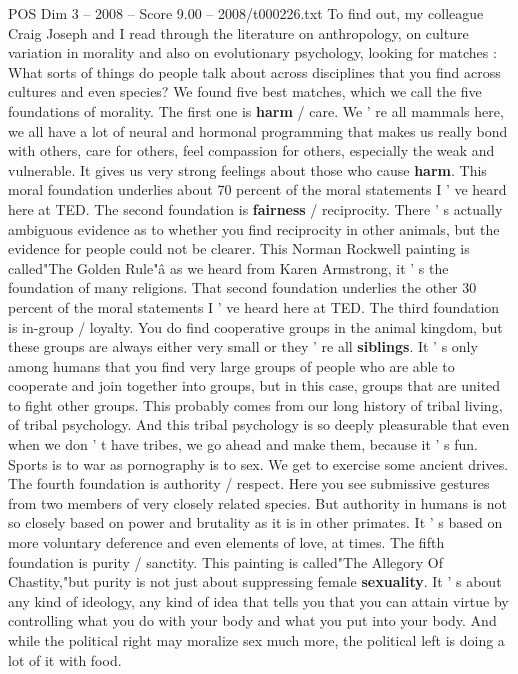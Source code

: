 \begin{textsample}{POS Dim 3 – 2008 – Score 9.00 – 2008/t000226.txt}
To find out, my colleague Craig Joseph and I read through the literature on anthropology, on culture variation in morality and also on evolutionary psychology, looking for matches : What sorts of things do people talk about across disciplines that you find across cultures and even species?
We found five best matches, which we call the five foundations of morality.
The first one is \textbf{harm} / care.
We ' re all mammals here, we all have a lot of neural and hormonal programming that makes us really bond with others, care for others, feel compassion for others, especially the weak and vulnerable.
It gives us very strong feelings about those who cause \textbf{harm}.
This moral foundation underlies about 70 percent of the moral statements I ' ve heard here at TED.
The second foundation is \textbf{fairness} / reciprocity.
There ' s actually ambiguous evidence as to whether you find reciprocity in other animals, but the evidence for people could not be clearer.
This Norman Rockwell painting is called"The Golden Rule"â as we heard from Karen Armstrong, it ' s the foundation of many religions.
That second foundation underlies the other 30 percent of the moral statements I ' ve heard here at TED.
The third foundation is in-group / loyalty.
You do find cooperative groups in the animal kingdom, but these groups are always either very small or they ' re all \textbf{siblings}.
It ' s only among humans that you find very large groups of people who are able to cooperate and join together into groups, but in this case, groups that are united to fight other groups.
This probably comes from our long history of tribal living, of tribal psychology.
And this tribal psychology is so deeply pleasurable that even when we don ' t have tribes, we go ahead and make them, because it ' s fun.
Sports is to war as pornography is to sex.
We get to exercise some ancient drives.
The fourth foundation is authority / respect.
Here you see submissive gestures from two members of very closely related species.
But authority in humans is not so closely based on power and brutality as it is in other primates.
It ' s based on more voluntary deference and even elements of love, at times.
The fifth foundation is purity / sanctity.
This painting is called"The Allegory Of Chastity,"but purity is not just about suppressing female \textbf{sexuality}.
It ' s about any kind of ideology, any kind of idea that tells you that you can attain virtue by controlling what you do with your body and what you put into your body.
And while the political right may moralize sex much more, the political left is doing a lot of it with food.

\end{textsample}
